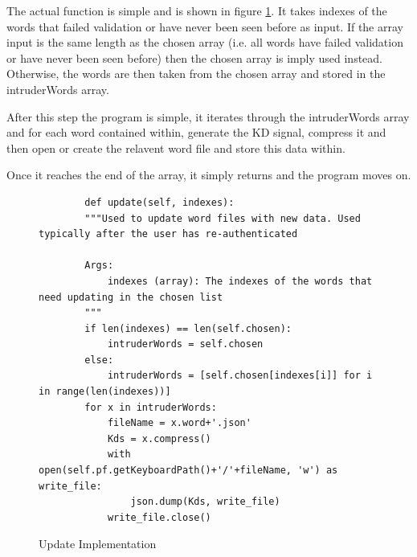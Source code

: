 \documentclass[10pt,a4paper]{report}
\begin{document}
The actual function is simple and is shown in figure \ref{fig:UpdateCode}. It takes indexes of the words that failed validation or have never been seen before as input. If the array input is the same length as the chosen array (i.e. all words have failed validation or have never been seen before) then the chosen array is imply used instead. Otherwise, the words are then taken from the chosen array and stored in the intruderWords array. 

After this step the program is simple, it iterates through the intruderWords array and for each word contained within, generate the KD signal, compress it and then open or create the relavent word file and store this data within.

Once it reaches the end of the array, it simply returns and the program moves on.

\begin{figure}
	\begin{lstlisting}
		def update(self, indexes):
        """Used to update word files with new data. Used typically after the user has re-authenticated

        Args:
            indexes (array): The indexes of the words that need updating in the chosen list
        """
        if len(indexes) == len(self.chosen):
            intruderWords = self.chosen
        else:
            intruderWords = [self.chosen[indexes[i]] for i in range(len(indexes))]
        for x in intruderWords:
            fileName = x.word+'.json'
            Kds = x.compress()
            with open(self.pf.getKeyboardPath()+'/'+fileName, 'w') as write_file:
                json.dump(Kds, write_file)
            write_file.close()
	\end{lstlisting}
	\caption{Update Implementation}
	\label{fig:UpdateCode}
\end{figure}
\end{document}
